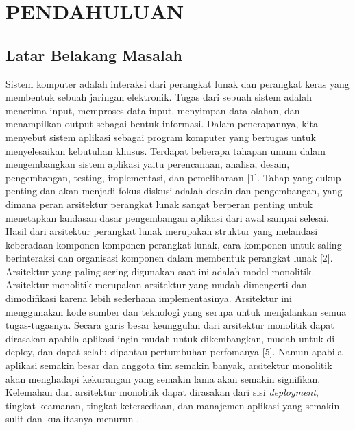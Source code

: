 \chapter{PENDAHULUAN}

\vspace{4.5pt}

\section{Latar Belakang Masalah} \label{sec:latar_belakang}
Sistem komputer adalah interaksi dari perangkat lunak dan perangkat keras yang membentuk sebuah jaringan elektronik. Tugas dari sebuah sistem adalah menerima input, memproses data input, menyimpan data olahan, dan menampilkan output sebagai bentuk informasi. Dalam penerapannya, kita menyebut sistem aplikasi sebagai program komputer yang bertugas untuk menyelesaikan kebutuhan khusus. Terdapat beberapa tahapan umum dalam mengembangkan sistem aplikasi yaitu perencanaan, analisa, desain, pengembangan, testing, implementasi, dan pemeliharaan [1].  Tahap yang cukup penting dan akan menjadi fokus diskusi adalah desain dan pengembangan, yang dimana peran arsitektur perangkat lunak sangat berperan penting untuk menetapkan landasan dasar pengembangan aplikasi dari awal sampai selesai. Hasil dari arsitektur perangkat lunak merupakan struktur yang melandasi keberadaan komponen-komponen perangkat lunak, cara komponen untuk saling berinteraksi dan organisasi komponen dalam membentuk perangkat lunak [2]. Arsitektur yang paling sering digunakan saat ini adalah model monolitik. Arsitektur monolitik merupakan arsitektur yang mudah dimengerti dan dimodifikasi karena lebih sederhana implementasinya. Arsitektur ini menggunakan kode sumber dan teknologi yang serupa untuk menjalankan semua tugas-tugasnya. Secara garis besar keunggulan dari arsitektur monolitik dapat dirasakan apabila aplikasi ingin mudah untuk dikembangkan, mudah untuk di deploy, dan dapat selalu dipantau pertumbuhan perfomanya [5]. Namun apabila aplikasi semakin besar dan anggota tim semakin banyak, arsitektur monolitik akan menghadapi kekurangan yang semakin lama akan semakin signifikan. Kelemahan dari arsitektur monolitik dapat dirasakan dari sisi \textit{deployment}, tingkat keamanan, tingkat ketersediaan, dan manajemen aplikasi yang semakin sulit dan kualitasnya menurun \cite{8}.\\
